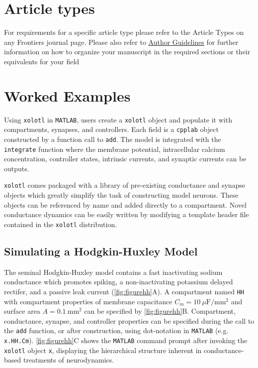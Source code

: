 \documentclass[utf8]{frontiersSCNS} %
\begin{document}
\section{Article types}

For requirements for a specific article type please refer to the Article Types on any Frontiers journal page. Please also refer to  \href{http://home.frontiersin.org/about/author-guidelines#Sections}{Author Guidelines} for further information on how to organize your manuscript in the required sections or their equivalents for your field


\section{Worked Examples}

Using \texttt{xolotl} in \texttt{MATLAB}, users create a \texttt{xolotl} object and populate it with compartments, synapses, and controllers. Each field is a \texttt{cpplab} object constructed by a function call to \texttt{add}. The model is integrated with the \texttt{integrate} function where the membrane potential, intracellular calcium concentration, controller states, intrinsic currents, and synaptic currents can be outputs.

\texttt{xolotl} comes packaged with a library of pre-existing conductance and synapse objects which greatly simplify the task of constructing model neurons. These objects can be referenced by name and added directly to a compartment. Novel conductance dynamics can be easily written by modifying a template header file contained in the \texttt{xolotl} distribution. 

\subsection{Simulating a Hodgkin-Huxley Model}

The seminal Hodgkin-Huxley model contains a fast inactivating sodium conductance which promotes spiking, a non-inactivating potassium delayed rectifer, and a passive leak current (\ref{fig:figurehh}A). A compartment named \texttt{HH} with compartment properties of membrane capacitance $C_m = 10 ~ \mu\mathrm{F/mm^2}$ and surface area $A = 0.1 ~ \mathrm{mm^2}$ can be specified by \ref{fig:figurehh}B. Compartment, conductance, synapse, and controller properties can be specified during the call to the \texttt{add} function, or after construction, using dot-notation in \texttt{MATLAB} (e.g. \texttt{x.HH.Cm}). \ref{fig:figurehh}C shows the \texttt{MATLAB} command prompt after invoking the \texttt{xolotl} object \texttt{x}, displaying the hierarchical structure inherent in conductance-based treatments of neurodynamics.
\end{document}
